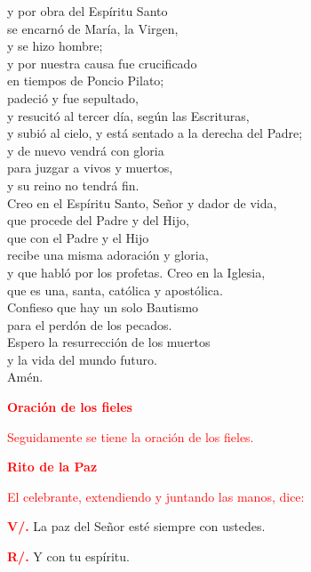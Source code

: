 \documentclass[12pt, letterpaper]{report}
\begin{document}
\noindent
\Large {y por obra del Esp\'iritu Santo\\
    se encarn\'o de Mar\'ia, la Virgen,\\
    y se hizo hombre;\\
    y por nuestra causa fue crucificado\\
    en tiempos de Poncio Pilato;\\
    padeci\'o y fue sepultado,\\
    y resucit\'o al tercer d\'ia, seg\'un las Escrituras,\\
    y subi\'o al cielo, y est\'a sentado a la derecha del Padre;\\
    y de nuevo vendr\'a con gloria\\
    para juzgar a vivos y muertos,\\
    y su reino no tendr\'a fin.\\
    Creo en el Esp\'iritu Santo, Se\~nor y dador de vida,\\
    que procede del Padre y del Hijo,\\
    que con el Padre y el Hijo\\
    recibe una misma adoraci\'on y gloria,\\
    y que habl\'o por los profetas.
    Creo en la Iglesia,\\
    que es una, santa, cat\'olica y apost\'olica.\\
    Confieso que hay un solo Bautismo\\
    para el perd\'on de los pecados.\\
    Espero la resurrecci\'on de los muertos\\
    y la vida del mundo futuro.\\
    Am\'en.
}

\Large {\bfseries \textcolor{red}{Oraci\'on de los fieles}} 

\large {\textcolor{red}{Seguidamente se tiene la oraci\'on de los fieles.}} 

\Large {\bfseries \textcolor{red}{Rito de la Paz}}

\large {\textcolor{red}{El celebrante, extendiendo y juntando las manos, dice:}}

\noindent
\Large {\bfseries \textcolor{red}{V/.}} \hspace{0.5cm} La paz del Se\~nor est\'e siempre con ustedes.

\noindent
\Large {\bfseries \textcolor{red}{R/.}} \hspace{0.5cm} Y con tu esp\'iritu. 
\end{document}
